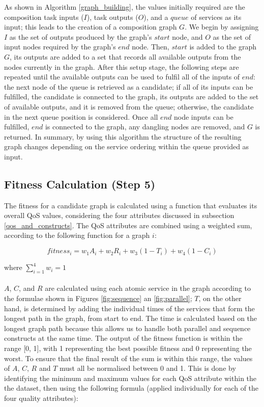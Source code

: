 \documentclass{llncs}
\begin{document}
 As shown in Algorithm \ref{graph_building}, the values initially required are the composition task inputs ($I$), task outputs ($O$), and a $queue$ of services as its input; this leads to the creation of a composition graph $G$. We begin by assigning $I$ as the set of outputs produced by the graph's $start$ node, and $O$ as the set of input nodes required by the graph's $end$ node. Then, $start$ is added to the graph $G$, its outputs are added to a set that records all available outputs from the nodes currently in the graph. After this setup stage, the following steps are repeated until the available outputs can be used to fulfil all of the inputs of $end$: the next node of the queue is retrieved as a candidate; if all of its inputs can be fulfilled, the candidate is connected to the graph, its outputs are added to the set of available outputs, and it is removed from the queue; otherwise, the candidate in the next queue position is considered. Once all $end$ node inputs can be fulfilled, $end$ is connected to the graph, any dangling nodes are removed, and $G$ is returned. In summary, by using this algorithm the structure of the resulting graph changes depending on the service ordering within the queue provided as input.

\subsection{Fitness Calculation (Step 5)}

The fitness for a candidate graph is calculated using a function that evaluates its overall QoS values, considering the four attributes discussed in subsection \ref{qos_and_constructs}. The QoS attributes are combined using a weighted sum, according to the following function for a graph $i$:

\begin{equation}
fitness_i = w_1A_i + w_2R_i + w_3(1 - T_i) + w_4(1 - C_i)
\end{equation}

\noindent where $\sum_{i=1}^{4} w_i = 1$
\\\\
$A$, $C$, and $R$ are calculated using each atomic service in the graph according to the formulae shown in Figures \ref{fig:sequence} an \ref{fig:parallel}; $T$, on the other hand, is determined by adding the individual times of the services that form the longest path in the graph, from start to end. The time is calculated based on the longest graph path because this allows us to handle both parallel and sequence constructs at the same time. The output of the fitness function is within the range [0, 1], with 1 representing the best possible fitness and 0 representing the worst. To ensure that the final result of the sum is within this range, the values of $A$, $C$, $R$ and $T$ must all be normalised between 0 and 1. This is done by identifying the minimum and maximum values for each QoS attribute within the the dataset, then using the following formula (applied individually for each of the four quality attributes):
\end{document}
